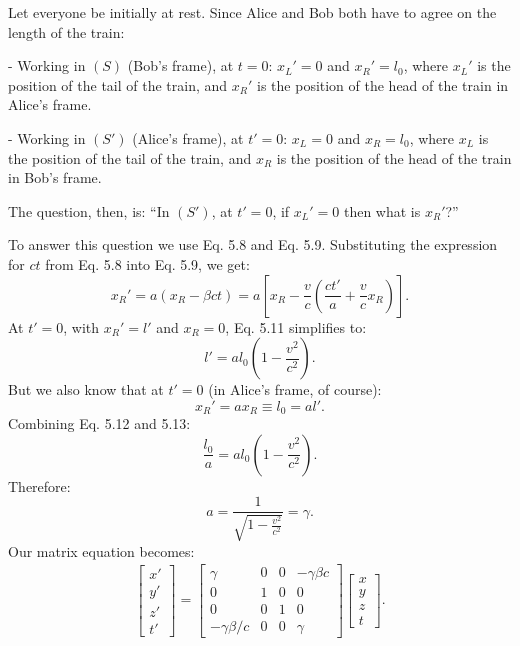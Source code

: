 \documentclass[a4paper,11pt]{article}
\numberwithin{equation}{section}
\begin{document}
 \noindent Let everyone be initially at rest. Since Alice and Bob both have to agree on the length of the train:
 
 \noindent - Working in $(S)$ (Bob's frame), at $t=0$: $x_L'=0$ and $x_R'=l_0$, where $x_L'$ is the position of the tail of the train, and $x_R'$ is the position of the head of the train in Alice's frame.  
 
 \noindent - Working in $(S')$ (Alice's frame), at $t'=0$: $x_L=0$ and $x_R=l_0$, where $x_L$ is the position of the tail of the train, and $x_R$ is the position of the head of the train in Bob's frame. 
 
 \noindent The question, then, is: ``In $(S')$, at $t'=0$, if $x_L'=0$ then what is $x_R'$?'' 
 
 \noindent To answer this question we use Eq. 5.8 and Eq. 5.9. Substituting the expression for $ct$ from Eq. 5.8 into Eq. 5.9, we get:
 \begin{equation}
 x_R'=a(x_R-\beta ct)=a\left[x_R-\frac{v}{c}\left(\frac{ct'}{a}+\frac{v}{c}x_R \right) \right].
 \end{equation}
 At $t'=0$, with $x_R'=l'$ and $x_R=0$, Eq. 5.11 simplifies to:
 \begin{equation}
 l'=al_0\left(1-\frac{v^2}{c^2} \right). 
 \end{equation}
 But we also know that at $t'=0$ (in Alice's frame, of course):
 \begin{equation}
 x_R'=ax_R \equiv l_0=al'.
 \end{equation}
 Combining Eq. 5.12 and 5.13:
 \begin{equation}
 \frac{l_0}{a}=al_0\left( 1-\frac{v^2}{c^2}\right). 
 \end{equation}
 Therefore:
 \begin{equation}
 a=\frac{1}{\sqrt{1-\frac{v^2}{c^2}}}=\gamma.
 \end{equation}
 Our matrix equation becomes:
 \begin{gather}
 \begin{bmatrix} x' \\ y' \\ z' \\ t' \end{bmatrix}
 =
 \begin{bmatrix}
 \gamma & 0 & 0 & -\gamma\beta c\\
 0 & 1 & 0 & 0\\
 0 & 0 & 1 & 0\\
 -\gamma\beta/c & 0 & 0 & \gamma
 \end{bmatrix}
 \begin{bmatrix}
 x \\ y \\ z \\ t
 \end{bmatrix}.
 \end{gather}
\end{document}
